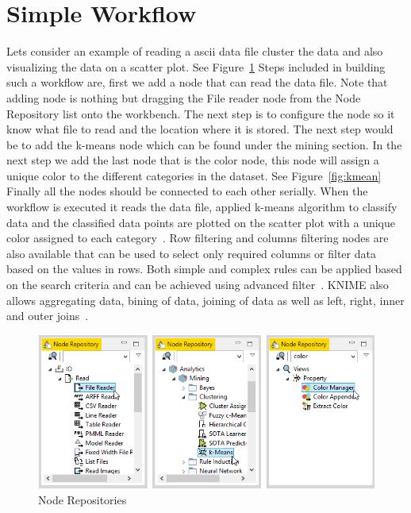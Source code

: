 \section{Simple Workflow}
Lets consider an example of reading a ascii data file cluster the data and also
visualizing the data on a scatter plot. See Figure~\ref{fig:noderep} Steps
included in building such a workflow are, first we add a node that can read the
data file.  Note that adding node is nothing but dragging the File reader node
from the Node Repository list onto the workbench. The next step is to configure
the node so it know what file to read and the location where it is stored.  The
next step would be to add the k-means node which can be found under the mining
section. In the next step we add the last node that is the color node, this node
will assign a unique color to the different categories in the dataset. See
Figure~\ref{fig:kmean} Finally all the nodes should be connected to each other
serially. When the workflow is executed it reads the data file, applied k-means
algorithm to classify data and the classified data points are plotted on the
scatter plot with a unique color assigned to each
category~\cite{hid-sp18-517-wf}.  Row filtering and columns filtering nodes are
also available that can be used to select only required columns or filter data
based on the values in rows. Both simple and complex rules can be applied based
on the search criteria and can be achieved using advanced
filter~\cite{hid-sp18-517-filters}.  KNIME also allows aggregating data, bining
of data, joining of data as well as left, right, inner and outer
joins~\cite{hid-sp18-517-join}.

\begin{figure}[!ht]
	\centering\includegraphics[width=\columnwidth]{../images/node_repositories.png}
	\caption{Node Repositories~\cite{hid-sp18-517-wf}}
 	\label{fig:noderep}
\end{figure}

